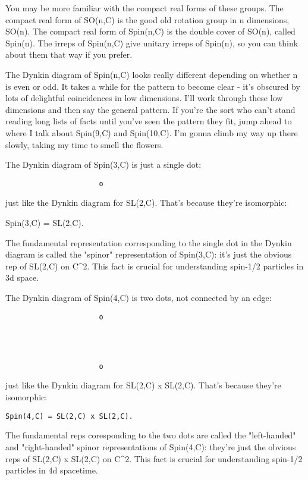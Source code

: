 You may be more familiar with the compact real forms of these groups.
The compact real form of SO(n,C) is the good old rotation group in n
dimensions, SO(n).  The compact real form of Spin(n,C) is the double
cover of SO(n), called Spin(n).  The irreps of Spin(n,C) give unitary
irreps of Spin(n), so you can think about them that way if you prefer.

The Dynkin diagram of Spin(n,C) looks really different depending on 
whether n is even or odd.  It takes a while for the pattern to
become clear - it's obscured by lots of delightful coincidences 
in low dimensions.  I'll work through these low dimensions and then
say the general pattern.  If you're the sort who can't stand reading
long lists of facts until you've seen the pattern they fit, jump 
ahead to where I talk about Spin(9,C) and Spin(10,C).  I'm gonna
climb my way up there slowly, taking my time to smell the flowers.

The Dynkin diagram of Spin(3,C) is just a single dot:

\begin{verbatim}
                      o
\end{verbatim}
    
just like the Dynkin diagram for SL(2,C).  That's because they're
isomorphic:

Spin(3,C) = SL(2,C).

The fundamental representation corresponding to the single dot in the
Dynkin diagram is called the "spinor" representation of Spin(3,C): 
it's just the obvious rep of SL(2,C) on C^{2}.
This fact is crucial for understanding spin-1/2 particles in 3d space.


The Dynkin diagram of Spin(4,C) is two dots, not connected by
an edge:

\begin{verbatim}
                      o



  
                      o
\end{verbatim}
    
just like the Dynkin diagram for SL(2,C) x SL(2,C).  That's because 
they're isomorphic:

\begin{verbatim}
Spin(4,C) = SL(2,C) x SL(2,C).
\end{verbatim}
    
The fundamental reps coresponding to the two dots are called 
the "left-handed" and "right-handed" spinor 
representations of Spin(4,C): they're just the obvious reps of 
SL(2,C) x SL(2,C) on C^{2}.  This fact is crucial for
understanding spin-1/2 particles in 4d spacetime. 

